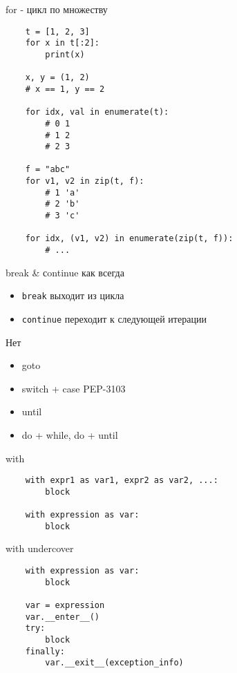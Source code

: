 \documentclass{article}
\begin{document}
\begin{center} for - цикл по множеству \end{center}
\vspace{15pt}
\begin{lstlisting}
	t = [1, 2, 3]
	for x in t[:2]:
		print(x)

	x, y = (1, 2)
	# x == 1, y == 2

	for idx, val in enumerate(t):
		# 0 1
		# 1 2
		# 2 3

	f = "abc"
	for v1, v2 in zip(t, f):
		# 1 'a'
		# 2 'b'
		# 3 'c'

	for idx, (v1, v2) in enumerate(zip(t, f)):
		# ...
\end{lstlisting}
\newpage
\begin{center} break \& сontinue как всегда \end{center}
\begin{itemize}
	\item \lstinline!break!  выходит из цикла
	\item \lstinline!continue! переходит к следующей итерации
\end{itemize}
\newpage

\begin{center} Нет \end{center}
\begin{itemize}
	\item goto
	\item switch + case PEP-3103
	\item until
	\item do + while, do + until
\end{itemize}
\newpage

\begin{center} with \end{center}
\vspace{15pt}
\begin{lstlisting}
	with expr1 as var1, expr2 as var2, ...:
		block

	with expression as var:
		block

\end{lstlisting}
\newpage

\begin{center} with undercover \end{center}
\vspace{15pt}
\begin{lstlisting}
	with expression as var:
		block

	var = expression
	var.__enter__()
	try:
		block
	finally:
		var.__exit__(exception_info)
\end{lstlisting}
\newpage
\end{document}
